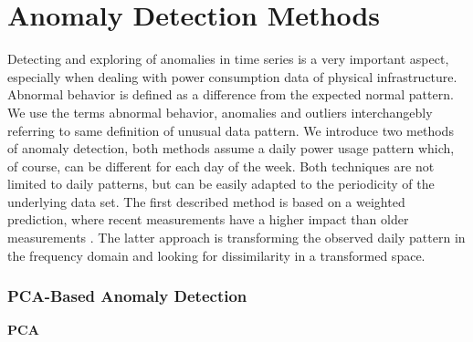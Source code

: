 \chapter{Anomaly Detection Methods}
Detecting and exploring of anomalies in time series is a very important aspect, especially when dealing with power consumption data of physical infrastructure. Abnormal behavior is defined as a difference from the expected normal pattern. We use the terms abnormal behavior, anomalies and outliers interchangebly referring to same definition of unusual data pattern. We introduce two methods of anomaly detection, both methods assume a daily power usage pattern which, of course, can be different for each day of the week. Both techniques are not limited to daily patterns, but can be easily adapted to the periodicity of the underlying data set. The first described method is based on a weighted prediction, where recent measurements have a higher impact than older measurements \cite{janetzko2014anomaly}. The latter approach is transforming the observed daily pattern in the frequency domain and looking for dissimilarity in a transformed space.
\\

\subsection*{PCA-Based Anomaly Detection}
\textbf{PCA}

